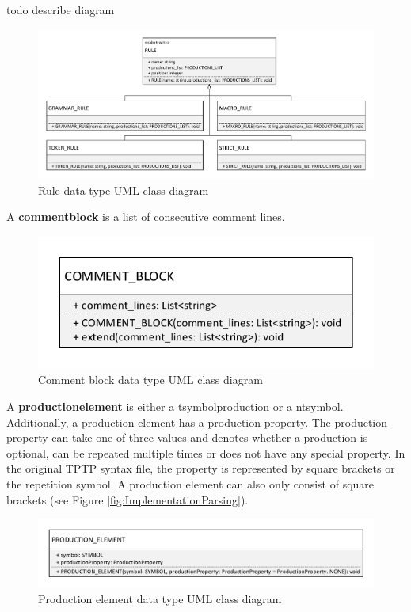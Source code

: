 todo describe diagram
\begin{figure}[H]
\centering
\includegraphics[width=1\textwidth]{images/Concept_uml_data_types_rules.pdf}
\caption{Rule data type UML class diagram}
\label{fig:ConceptRulesClassDiagram}
\end{figure}

A \textbf{comment\textunderscore block} is a list of consecutive comment lines. 

\begin{figure}[H]
\centering
\includegraphics[width=.5\textwidth]{images/Concept_uml_data_types_comment_block.pdf}
\caption{Comment block data type UML class diagram}
\label{fig:ConceptCommentBlockClassDiagram}
\end{figure}


A \textbf{production\textunderscore element} is either a t\textunderscore symbol\textunderscore production or a nt\textunderscore symbol. Additionally, a production element has a production property.
The production property can take one of three values and denotes whether a production is optional, can be repeated multiple times or does not have any special property.
In the original TPTP syntax file, the property is represented by square brackets or the repetition symbol. A production element can also only consist of square brackets (see Figure \ref{fig:ImplementationParsing}).

\begin{figure}[H]
\centering
\includegraphics[width=.8\textwidth]{images/Concept_uml_data_types_production_element.pdf}
\caption{Production element data type UML class diagram}
\label{fig:ConceptProductionElementClassDiagram}
\end{figure}

